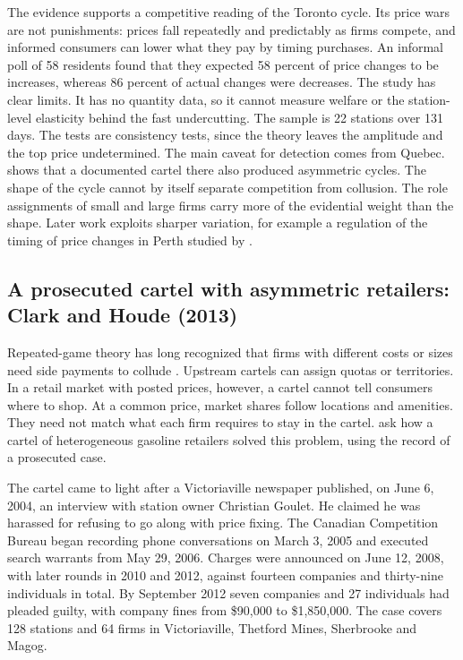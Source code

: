 The evidence supports a competitive reading of the Toronto cycle. Its price wars are not punishments: prices fall
repeatedly and predictably as firms compete, and informed consumers can lower what they pay by timing purchases. An
informal poll of 58 residents found that they expected 58 percent of price changes to be increases, whereas 86 percent
of actual changes were decreases. The study has clear limits. It has no quantity data, so it cannot measure welfare or
the station-level elasticity behind the fast undercutting. The sample is 22 stations over 131 days. The tests are
consistency tests, since the theory leaves the amplitude and the top price undetermined. The main caveat for
detection comes from Quebec.  shows that a documented cartel there also produced asymmetric
cycles. The shape
of the cycle cannot by itself separate competition from collusion. The role assignments of small and large firms carry
more of the evidential weight than the shape. Later work exploits sharper variation, for example a regulation of the
timing of price changes in Perth studied by \citet{Wang2009}.

\subsection{A prosecuted cartel with asymmetric retailers: Clark and Houde (2013)}\label{sec:13-clarkhoude}

Repeated-game theory has long recognized that firms with different costs or sizes need side payments to collude
\citep{JacqueminSlade1989}. Upstream cartels can assign quotas or territories. In a retail market with posted prices,
however, a cartel cannot tell consumers where to shop. At a common price, market shares follow locations and
amenities. They need not match what each firm requires to stay in the cartel. \citet{ClarkHoude2013} ask how a cartel of heterogeneous gasoline
retailers solved this problem, using the record of a prosecuted case.

The cartel came to light after a Victoriaville newspaper published, on June 6, 2004, an interview with station owner
Christian Goulet. He claimed he was harassed for refusing to go along with price fixing. The Canadian Competition
Bureau began recording phone conversations on March 3, 2005 and executed search warrants from May 29, 2006. Charges were
announced on June 12, 2008, with later rounds in 2010 and 2012, against fourteen companies and thirty-nine individuals
in total. By September 2012 seven companies and 27 individuals had pleaded guilty, with company fines from \$90,000 to
\$1,850,000. The case covers 128 stations and 64 firms in Victoriaville, Thetford Mines, Sherbrooke and Magog.

